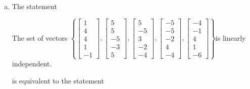 \begin{exerciseAnswer}
\begin{enumerate}[(a)]
\item The statement 
\begin{center}\begin{minipage}{0.8\textwidth}
 The set of vectors \( \left\{ \left[\begin{array}{c}
1 \\
4 \\
4 \\
1 \\
-1
\end{array}\right] , \left[\begin{array}{c}
5 \\
5 \\
-5 \\
-3 \\
5
\end{array}\right] , \left[\begin{array}{c}
5 \\
-5 \\
3 \\
-2 \\
-4
\end{array}\right] , \left[\begin{array}{c}
-5 \\
-5 \\
-2 \\
4 \\
-4
\end{array}\right] , \left[\begin{array}{c}
-4 \\
-1 \\
4 \\
1 \\
-6
\end{array}\right] \right\} \)is linearly independent.
\end{minipage}\end{center}
     is equivalent to the statement 
\begin{center}\begin{minipage}{0.8\textwidth}
 The vector equation \( x_{1} \left[\begin{array}{c}
1 \\
4 \\
4 \\
1 \\
-1
\end{array}\right] + x_{2} \left[\begin{array}{c}
5 \\
5 \\

\end{array}
\end{minipage}
\end{center}
\end{enumerate}
\end{exerciseAnswer}

